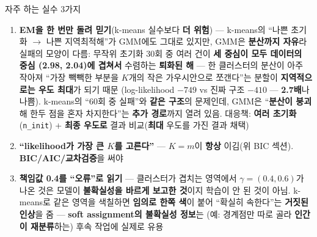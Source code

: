 \documentclass[aspectratio=169,11pt]{beamer}
\begin{document}
\begin{frame}{자주 하는 실수 3가지}
  \small
  \begin{enumerate}
    \item \textbf{EM을 한 번만 돌려 믿기}(k-means 실수보다
      \textbf{더 위험}) --- k-means의 ``나쁜 초기화 $\to$
      나쁜 지역최적해''가 GMM에도 그대로 있지만, GMM은
      \textbf{분산까지 자유}라 실패의 모양이 다름: 무작위
      초기화 30회 중 여러 건이 \textbf{세 중심이 모두 데이터의
      중심 (2.98, 2.04)에 겹쳐서} 수렴하는 \textbf{퇴화된 해}
      --- 한 클러스터의 분산이 아주 작아져 ``가장 빽빽한 부분을
      $K$개의 작은 가우시안으로 쪼갠다''는 분할이
      \textbf{지역적으로는 우도 최대}가 되기 때문
      (log-likelihood $-749$ vs 진짜 구조 $-410$ ---
      \textbf{2.7배}나 나쁨). k-means의
      ``60회 중 실패''와 \textbf{같은 구조}의 문제인데, GMM은
      ``\textbf{분산이 붕괴}해 한두 점을 혼자 차지한다''는
      \textbf{추가 경로}까지 열려 있음. 대응책: \textbf{여러
      초기화}(\texttt{n\_init}) + \textbf{최종 우도로} 결과
      비교(\textbf{최대} 우도를 가진 결과 채택)
    \item \textbf{``likelihood가 가장 큰 $K$를 고른다''} ---
      $K = m$이 \textbf{항상} 이김(위 BIC 섹션).
      \textbf{BIC/AIC/교차검증}을 써야
    \item \textbf{책임값 0.4를 ``오류''로 읽기} ---
      클러스터가 겹치는 영역에서 $\gamma = (0.4, 0.6)$가
      나온 것은 모델이 \textbf{불확실성을 바르게 보고한
      것}이지 학습이 안 된 것이 아님. k-means로 같은 영역을
      색칠하면 \textbf{임의로 한쪽 색}이 붙어 ``확실히
      속한다''는 \textbf{거짓된 인상}을 줌 ---
      \textbf{soft assignment의 불확실성 정보}는
      (예: 경계점만 따로 골라 \textbf{인간이 재분류}하는)
      후속 작업에 실제로 유용
  \end{enumerate}
\end{frame}
\end{document}
